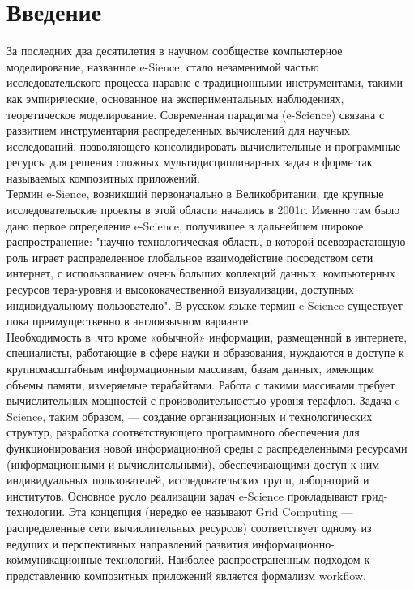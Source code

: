 \documentclass[koi8-r,usehyperref,12pt]{G7-32}
\begin{document}
\textwidth 15.5cm
\topmargin -1cm
\parindent 1cm
\textheight 24cm
\parskip 1.5mm



\newpage
\section{Введение}

За последних два десятилетия в научном сообществе компьютерное моделирование, названное e-Sience, стало незаменимой частью исследовательского процесса наравне с традиционными инструментами, такими как эмпирические, основанное на  экспериментальных наблюдениях, теоретическое моделирование. Современная парадигма (e-Science) связана с развитием инструментария распределенных вычислений для научных исследований, позволяющего консолидировать вычислительные и программные ресурсы для решения сложных мультидисциплинарных задач в форме так называемых композитных приложений.\\ 

Термин e-Sience, возникший первоначально в Великобритании, где крупные исследовательские проекты в этой области начались в 2001г. Именно там было дано первое определение e-Science, получившее в дальнейшем широкое распространение: "научно-технологическая область, в которой всевозрастающую роль играет распределенное глобальное взаимодействие посредством сети интернет, с использованием очень больших коллекций данных, компьютерных ресурсов тера-уровня и высококачественной визуализации, доступных индивидуальному
пользователю". В русском языке термин e-Science существует пока преимущественно в англоязычном варианте.\\
 Необходимость в ,что кроме «обычной» информации, размещенной в интернете, специалисты, работающие в сфере науки и образования, нуждаются в доступе к крупномасштабным информационным массивам, базам данных, имеющим объемы памяти, измеряемые терабайтами. Работа с такими массивами
требует вычислительных мощностей с производительностью уровня терафлоп.  
Задача e-Science, таким образом, — создание организационных и технологических структур, разработка соответствующего программного обеспечения для функционирования новой информационной среды с
распределенными ресурсами (информационными и вычислительными), обеспечивающими доступ к ним индивидуальных пользователей, исследовательских групп, лабораторий и институтов.
Основное русло реализации задач e-Science прокладывают грид-технологии. Эта концепция (нередко ее называют Grid Computing — распределенные сети вычислительных ресурсов) соответствует
одному из ведущих и перспективных направлений развития информационно-коммуникационные технологий.
Наиболее распространенным подходом к представлению композитных приложений является формализм workflow. 
\end{document}
